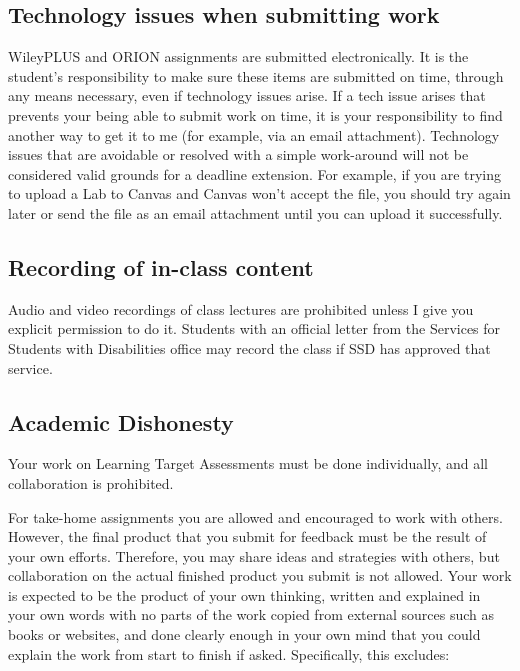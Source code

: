 \hypertarget{technology-issues-when-submitting-work}{%
\subsection{Technology issues when submitting
work}\label{technology-issues-when-submitting-work}}

WileyPLUS and ORION assignments are submitted electronically. It is the
student's responsibility to make sure these items are submitted on time,
through any means necessary, even if technology issues arise. If a tech
issue arises that prevents your being able to submit work on time, it is
your responsibility to find another way to get it to me (for example,
via an email attachment). Technology issues that are avoidable or
resolved with a simple work-around will not be considered valid grounds
for a deadline extension. For example, if you are trying to upload a Lab
to Canvas and Canvas won't accept the file, you should try again later
or send the file as an email attachment until you can upload it
successfully.

\hypertarget{recording-of-in-class-content}{%
\subsection{Recording of in-class
content}\label{recording-of-in-class-content}}

Audio and video recordings of class lectures are prohibited unless I
give you explicit permission to do it. Students with an official letter
from the Services for Students with Disabilities office may record the
class if SSD has approved that service.

\hypertarget{academic-dishonesty}{%
\subsection{Academic Dishonesty}\label{academic-dishonesty}}

Your work on Learning Target Assessments must be done individually, and
all collaboration is prohibited.

For take-home assignments you are allowed and encouraged to work with
others. However, the final product that you submit for feedback must be
the result of your own efforts. Therefore, you may share ideas and
strategies with others, but collaboration on the actual finished product
you submit is not allowed. Your work is expected to be the product of
your own thinking, written and explained in your own words with no parts
of the work copied from external sources such as books or websites, and
done clearly enough in your own mind that you could explain the work
from start to finish if asked. Specifically, this excludes:

